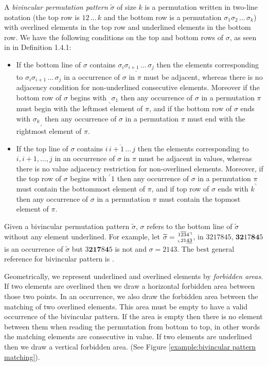 \documentclass[a4paper]{llncs}
\newcommand\BV[2]{\genfrac{}{}{0pt}{}{#1}{#2}}
\begin{document}
A \emph{bivincular permutation pattern} $\widetilde{\sigma}$
of size $k$ is a permutation written in
two-line notation
(the top row is $12\,\ldots\,k$ and the bottom row
is a permutation $\sigma_1\sigma_2\,\ldots\,\sigma_k$)
with overlined elements in the top row and underlined elements in the bottom row.
We have the following conditions on the top and bottom rows
of $\sigma$, as seen in \cite{Kitaev:book:2011} in Definition 1.4.1:
\begin{itemize}
	\item
	If the bottom line of $\sigma$ contains
	$\underline{\sigma_i\sigma_{i+1}\,\ldots\,\sigma_j}$
	then the elements corresponding to
	$\sigma_i\sigma_{i+1}\,\ldots\,\sigma_j$ in a occurrence of
	$\sigma$ in $\pi$ must be adjacent, whereas there is
	no adjacency condition for
	non-underlined consecutive elements.
	Moreover if the bottom row of $\sigma$ begins with
	$_\llcorner{\sigma_1}$ then any occurrence of $\sigma$
	in a permutation $\pi$ must begin with the leftmost
	element of $\pi$,
	and
	if the bottom row of $\sigma$ ends with
	${\sigma_k}_\lrcorner$ then any occurrence of $\sigma$
	in a permutation $\pi$ must end with the rightmost
	element of $\pi$.
	\item
	If the top line of $\sigma$ contains
	$\overline{i\,i+1\,\ldots\,j}$ then the elements corresponding to
	$i, i+1, \ldots, j$ in an
	occurrence of $\sigma$ in $\pi$ must be adjacent in values,
	whereas there is no value adjacency restriction for non-overlined
	elements.
	Moreover, if the top row of $\sigma$ begins with
	$^\ulcorner{1}$ then
	any occurrence of $\sigma$ in a permutation $\pi$ must contain
	the bottommost element of $\pi$, and
	if top row of $\sigma$ ends with $k^\urcorner$ then
	any occurrence of $\sigma$ in a permutation $\pi$ must contain
	the topmost element of $\pi$.
\end{itemize}

Given a bivincular permutation pattern $\widetilde{\sigma}$,
$\sigma$ refers to the bottom line of $\widetilde{\sigma}$
without any element underlined.
For example,
let
$\widetilde{\sigma} = \BV{1\overline{23}4\urcorner}{\llcorner 21\underline{43}}$,
in $3217845$, $\textbf{32}17\textbf{84}5$ is an occurrence  of $\widetilde{\sigma}$ but $3\textbf{21}\textbf{7}8\textbf{4}5$ is not
and $\sigma = 2143$.
The best general reference for bivincular pattern is \cite{Kitaev:book:2011}.





Geometrically, we represent underlined and overlined elements by \textit{forbidden areas}.
If two elements are overlined then we draw a horizontal forbidden area between those two points.
In an occurrence, we also draw the forbidden area between the matching of two overlined elements.
This area must be empty to have a valid occurrence of the bivincular pattern.
If the area is empty then there is no element between them when reading the permutation
from bottom to top,
in other words the matching elements are consecutive in value.
If two elements are underlined then we draw a vertical forbidden area.
(See Figure \ref{example:bivincular pattern matching}).
\end{document}
